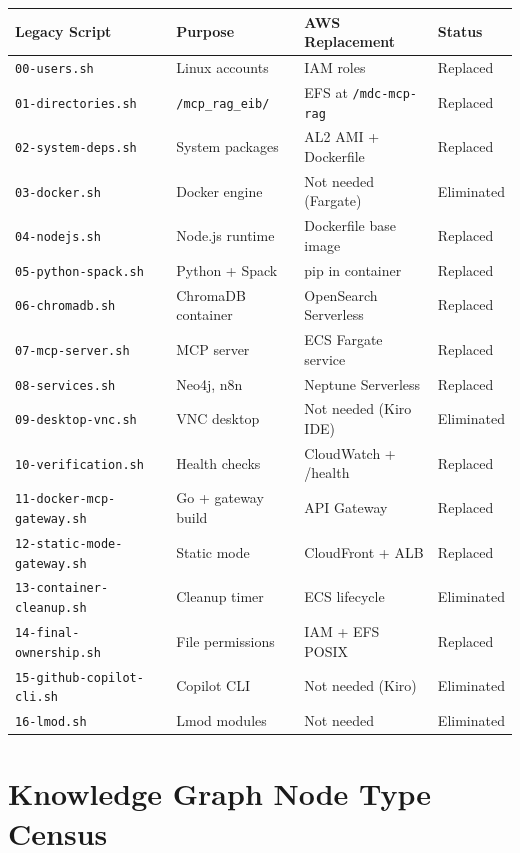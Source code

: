 \documentclass[11pt,letterpaper]{article}
\begin{document}
\begin{longtable}{@{}llll@{}}
\toprule
\textbf{Legacy Script} & \textbf{Purpose} & \textbf{AWS Replacement} & \textbf{Status} \\
\midrule
\endfirsthead
\midrule
\endhead
\bottomrule
\endlastfoot

\texttt{00-users.sh} & Linux accounts & IAM roles & Replaced \\
\texttt{01-directories.sh} & \texttt{/mcp\_rag\_eib/} & EFS at \texttt{/mdc-mcp-rag} & Replaced \\
\texttt{02-system-deps.sh} & System packages & AL2 AMI + Dockerfile & Replaced \\
\texttt{03-docker.sh} & Docker engine & Not needed (Fargate) & Eliminated \\
\texttt{04-nodejs.sh} & Node.js runtime & Dockerfile base image & Replaced \\
\texttt{05-python-spack.sh} & Python + Spack & pip in container & Replaced \\
\texttt{06-chromadb.sh} & ChromaDB container & OpenSearch Serverless & Replaced \\
\texttt{07-mcp-server.sh} & MCP server & ECS Fargate service & Replaced \\
\texttt{08-services.sh} & Neo4j, n8n & Neptune Serverless & Replaced \\
\texttt{09-desktop-vnc.sh} & VNC desktop & Not needed (Kiro IDE) & Eliminated \\
\texttt{10-verification.sh} & Health checks & CloudWatch + /health & Replaced \\
\texttt{11-docker-mcp-gateway.sh} & Go + gateway build & API Gateway & Replaced \\
\texttt{12-static-mode-gateway.sh} & Static mode & CloudFront + ALB & Replaced \\
\texttt{13-container-cleanup.sh} & Cleanup timer & ECS lifecycle & Eliminated \\
\texttt{14-final-ownership.sh} & File permissions & IAM + EFS POSIX & Replaced \\
\texttt{15-github-copilot-cli.sh} & Copilot CLI & Not needed (Kiro) & Eliminated \\
\texttt{16-lmod.sh} & Lmod modules & Not needed & Eliminated \\

\end{longtable}

\section{Knowledge Graph Node Type Census}
\label{app:graph-census}
\end{document}
